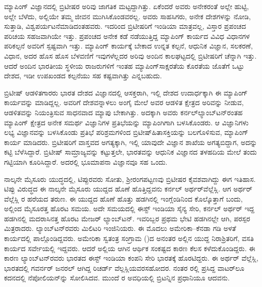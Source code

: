 ಮ್ಯಾಪಿಂಗ್​ ವಿಜ್ಞಾನದಲ್ಲಿ ಬ್ರಿಟೀಷರ ಅರಿವು ಜಾಗತಿಕ ಮಟ್ಟದ್ದಾಗಿತ್ತು. ಏಕೆಂದರೆ ಅವರು ಅನೇಕರಂತೆ ಅಲ್ಲೇ ಹುಟ್ಟಿ, ಅಲ್ಲೇ ಬೆಳೆದು, ಅಲ್ಲಿಯೇ ತಮ್ಮ ಜೀವನ ಮುಗಿಸಿಕೊಂಡವರಲ್ಲ. ಅವರು ಸಾಹಸಿಗರು, ಅನೇಕ ದೇಶಗಳನ್ನು ನೋಡಿ, ಸುತ್ತಾಡಿ, ವಿಶ್ವಪರ್ಯಟನೆ\break ಮಾಡಿದಂತಹವರು. ಇದರಿಂದ ಬ್ರಿಟೀಷರಿಗೆ ಇಂಡಿಯಾ ಮಾತ್ರವಲ್ಲ, ವಿಸ್ತಾರ ಪ್ರಪಂಚದ ಪರಿಚಯ ಸಹಜವಾಗಿಯೇ ಇತ್ತು. ಪ್ರಪಂಚದ ಅನೇಕ ಕಡೆ ನಡೆಯುತ್ತಿದ್ದ ಮ್ಯಾಪಿಂಗ್​ ಕಾರ್ಯದ ವಿವಿಧ ವಿಧಾನಗಳ ಪರಿಕಲ್ಪನೆ ಅವರಿಗೆ ಸ್ಪಷ್ಟವಾಗಿ ಇತ್ತು. ಮ್ಯಾಪಿಂಗ್​ ಕಾರ್ಯಕ್ಕೆ ಬೇಕಾದ ಉನ್ನತ ಕಲ್ಪನೆ, ಆಧುನಿಕ ವಿಜ್ಞಾನ, ಸಲಕರಣೆ, ವಿಧಾನ, ಅದರ ಹೊಸ ಹೊಸ ಬೆಳವಣಿಗೆ ಇವುಗಳೆಲ್ಲದರ ಅರಿವು ಅಂದಿನ ಕಾಲಘಟ್ಟದಲ್ಲಿ ಬ್ರಿಟೀಷರಿಗೆ ಚೆನ್ನಾಗಿ ಇತ್ತು. ಆದರೆ ಅಂದಿನ ಭಾರತೀಯ ಸ್ಥಳೀಯ ರಾಜರುಗಳಿಗೆ ಇಂತಹ ಮ್ಯಾಪಿಂಗ್​ ಸಾಕ್ಷರತೆಯ ಕೊರತೆಯ ಜೊತೆಗೆ ಒಟ್ಟು ದೇಶದ, ಇಡೀ ಉಪಖಂಡದ ಕಲ್ಪನೆಯು ಸಹ ಕಷ್ಟವಾಗಿತ್ತು ಎನ್ನಬಹುದು.

ಬ್ರಿಟೀಷ್​ ಆಡಳಿತಗಾರರು ಭಾರತ ದೇಶದ ವಿಜ್ಞಾನದಲ್ಲಿ ಆಸಕ್ತರಾಗಿ, ಇಲ್ಲಿ ದೇಶದ ಉದಾರ್ಧಕ್ಕಾಗಿ ಈ ಮ್ಯಾಪಿಂಗ್​ ಕಾರ್ಯವನ್ನು ಮಾಡಿದ್ದಲ್ಲ. ಅವರಿಗೆ ದೇಶವನ್ನಾಳಲು ಅಂಗೈ ಮೇಲೆ ಅವರ ಆಡಳಿತ ಕ್ಷೇತ್ರದ ಅರಿವನ್ನು ನೀಡುವ, ಆಡಳಿತವನ್ನು ನಿಯಂತ್ರಿಸುವ ಸಾಧನವಾದ ಮ್ಯಾಪು ಬೇಕಾಗಿತ್ತು. ಅದಕ್ಕಾಗಿ ಅವರು ಕರ್ನಲ್​ ಲ್ಯಾಂಬ್​ಟನ್​ರಂತಹ ಮ್ಯಾಪಿಂಗ್​ ಕ್ಷೇತ್ರದ ಅನೇಕ ಸಮರ್ಥ ವಿಜ್ಞಾನಿಗಳ ಪ್ರತಿಭೆಯನ್ನು ಮ್ಯಾಪಿಂಗಿಗಾಗಿ ಬಳಸಿಕೊಂಡರು. ಆ ವಿಜ್ಞಾನಿಗಳು ಲಭ್ಯ ವಿಜ್ಞಾನವನ್ನು ಬಳಸಿಕೊಂಡು ಪ್ರತಿಭೆ ಪರಿಶ್ರಮಗಳಿಂದ ಬ್ರಿಟೀಷ್​ ಹಿತಾಸಕ್ತಿಯನ್ನು ಬಲಗೊಳಿಸುವ, ಮ್ಯಾಪಿಂಗ್​ ಕಾರ್ಯ ಮಾಡಿದರು. ಬ್ರಿಟೀಷರಿಗೆ ವಾಸ್ತವದ ಅಗತ್ಯಕ್ಕಾಗಿ, ಇಲ್ಲಿ ಯಾವುದೇ ವಿಜ್ಞಾನ ಶಾಖೆಯ ಅಗತ್ಯಬಿದ್ದಾಗ, ಅದನ್ನು ಕಟ್ಟಿ ಬೆಳೆಸಿದ್ದಾರೆ. ಬ್ರಿಟೀಷ್​ ಸಾಮ್ರಾಜ್ಯವನ್ನು ಕಟ್ಟುತ್ತಲೇ, ಭಾರತವನ್ನು ಆಧುನಿಕ ವಿಜ್ಞಾನದ ತಳಹದಿಯ ಮೇಲೆ ತಂದು ಗಟ್ಟಿಯಾಗಿ ಕೂರಿಸಿದ್ದಾರೆ. ಅದರಲ್ಲಿ ಭೂಮಾಪನಾ ವಿಜ್ಞಾನವೂ ಸಹ ಒಂದು.

ನಾಲ್ಕನೇ ಮೈಸೂರು ಯುದ್ಧದಲ್ಲಿ, ಟಿಪ್ಪುರವರು ಸೋತು, ಶ‍್ರೀರಂಗಪಟ್ಟಣವು ಬ್ರಿಟೀಷರ ಕೈವಶವಾಗಿದ್ದು ಈಗ ಇತಿಹಾಸ. ಟಿಪ್ಪು ವಿರುದ್ಧದ ಈ ನಾಲ್ಕನೇ ಮೈಸೂರು ಯುದ್ದದ ಹೊಣೆ ಹೊತ್ತಿದ್ದವನು ಕರ್ನಲ್​ ಅರ್ಥರ್​ ವೆಲ್ಲೆಸ್ಲಿ. ಆಗ ಅರ್ಥರ್​ ವೆಲ್ಲೆಸ್ಲಿ ರ ಹರೆಯದ ತರುಣ. ಈ ಯುದ್ದದ ಹೊಣೆ ಹೊತ್ತು ಹಡಗಿನಲ್ಲಿ ಇಂಗ್ಲೆಂಡಿನಿಂದ ಕೊಲ್ಕೊತ್ತಾಗೆ ಬಂದು, ಅಲ್ಲಿಂದ ಮೈಸೂರತ್ತ ಹೊರಟ ಸಮಯ. ಅದೇ ಸಮಯದಲ್ಲಿ ಈಸ್ಟ್​ ಇಂಡಿಯಾ ಸೈನ್ಯ ಸೇರಿ, ಕರ್ನಲ್​ ಅರ್ಥರ್​ ಇದ್ದ ಹಡಗಿನಲ್ಲಿ ಮದರಾಸಿನತ್ತ ಹೊರಟ ಮೇಜರ್​ ಲ್ಯಾಂಬ್​ಟನ್​. ಇವರಿಬ್ಬರ ಪ್ರಥಮ ಭೇಟಿ ಹಡಗಿನಲ್ಲೇ ಆಗಿ, ಪರಸ್ಪರ ಮಿತ್ರರಾದರು. ಲ್ಯಾಂಬ್​ಟನ್​ರವರು ಮಿಲಿಟರಿ ಇಂಜಿನಿಯರು. ಈ ಮೊದಲು ಅಮೇರಿಕಾ–ಕೆನಡಾ ಗಡಿ ಅಳತೆ ಕಾರ್ಯದಲ್ಲಿ ಪಾಲ್ಗೊಂಡಿದ್ದವರು. ಅಮೇರಿಕಾ ಸ್ವತಂತ್ರ ಸಂಗ್ರಾಮ ()ದ ಅನಂತರ ಅಲ್ಲಿನ ಯುದ್ದ ನಿರಾಶ್ರಿತರಿಗೆ, ವಸತಿ ಕಾರ್ಯದ ಸರ್ವೇಯಲ್ಲಿ ಇದ್ದವರು. ಆದರೆ ಅಲ್ಲಿಯ ಆಗಿನ ಆರ್ಥಿಕ ಸಂಕಷ್ಟದ ಕಾರಣ ಕೆಲಸ ಕಳೆದುಕೊಂಡಿದ್ದರು. ಈ ಕಾರಣ ಲ್ಯಾಂಬ್​ಟನ್​ರವರು ಭಾರತದ ಈಸ್ಟ್​ ಇಂಡಿಯಾ ಕಂಪನಿ ಸೇರಿ ಭಾರತಕ್ಕೆ ಹೊರಟಿದ್ದರು. ಈ ಅರ್ಥರ್​ ವೆಲ್ಲೆಸ್ಲಿ, ಭಾರತದಲ್ಲಿ ಗವರ್ನರ್​ ಜನರಲ್​ ಆಗಿದ್ದ ರಿಚರ್ಡ್ ವೆಲ್ಲಸ್ಲಿಯವರ\break ಸಹೋದರ. ನಂತರ  ರಲ್ಲಿ ಪ್ರಸಿದ್ದ ವಾಟರ್​ಲೂ ಕದನದಲ್ಲಿ ನೆಪೋಲಿಯನ್‌ನ್ನು ಸೋಲಿಸಿದವ. ಮುಂದೆ  ರ ಅವಧಿಯಲ್ಲಿ ಬ್ರಿಟನ್ನಿನ ಪ್ರಧಾನಿಯೂ ಆದವನು.

